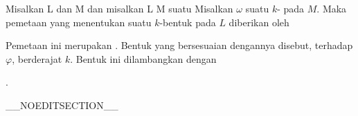 {}
{

Misalkan
\mathkor {} {L} {dan} {M} {}
dan misalkan
\maabbdisp {\varphi} { L } { M
} {}
suatu
Misalkan $\omega$ suatu $k$-
pada $M$. Maka pemetaan yang menentukan suatu $k$-bentuk pada $L$ diberikan oleh

 {  }

Pemetaan ini merupakan
.
Bentuk yang bersesuaian dengannya disebut, terhadap $\varphi$,  berderajat $k$. Bentuk ini dilambangkan dengan

\mathdisp {\varphi^* \omega} {  }.

}

__NOEDITSECTION__


